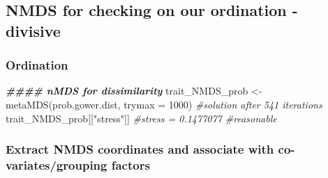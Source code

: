\documentclass[
]{article}
\newenvironment{Shaded}{\begin{snugshade}}{\end{snugshade}}
\newcommand{\AttributeTok}[1]{\textcolor[rgb]{0.77,0.63,0.00}{#1}}
\newcommand{\CommentTok}[1]{\textcolor[rgb]{0.56,0.35,0.01}{\textit{#1}}}
\newcommand{\DecValTok}[1]{\textcolor[rgb]{0.00,0.00,0.81}{#1}}
\newcommand{\DocumentationTok}[1]{\textcolor[rgb]{0.56,0.35,0.01}{\textbf{\textit{#1}}}}
\newcommand{\FunctionTok}[1]{\textcolor[rgb]{0.00,0.00,0.00}{#1}}
\newcommand{\NormalTok}[1]{#1}
\newcommand{\OtherTok}[1]{\textcolor[rgb]{0.56,0.35,0.01}{#1}}
\newcommand{\SpecialCharTok}[1]{\textcolor[rgb]{0.00,0.00,0.00}{#1}}
\newcommand{\StringTok}[1]{\textcolor[rgb]{0.31,0.60,0.02}{#1}}
\begin{document}
\begin{Shaded}
\end{Shaded}

\hypertarget{nmds-for-checking-on-our-ordination---divisive}{%
\subsection{NMDS for checking on our ordination -
divisive}\label{nmds-for-checking-on-our-ordination---divisive}}

\hypertarget{ordination}{%
\subsubsection{Ordination}\label{ordination}}

\begin{Shaded}
\begin{Highlighting}[]
\DocumentationTok{\#\#\#\# nMDS for dissimilarity}
\NormalTok{trait\_NMDS\_prob }\OtherTok{\textless{}{-}} \FunctionTok{metaMDS}\NormalTok{(prob.gower.dist, }\AttributeTok{trymax =} \DecValTok{1000}\NormalTok{)  }\CommentTok{\#solution after 541 iterations}
\NormalTok{trait\_NMDS\_prob[[}\StringTok{"stress"}\NormalTok{]]  }\CommentTok{\#stress = 0.1477077 \#reasonable}
\end{Highlighting}
\end{Shaded}

\hypertarget{extract-nmds-coordinates-and-associate-with-co-variatesgrouping-factors}{%
\subsubsection{Extract NMDS coordinates and associate with
co-variates/grouping
factors}\label{extract-nmds-coordinates-and-associate-with-co-variatesgrouping-factors}}
\end{document}
